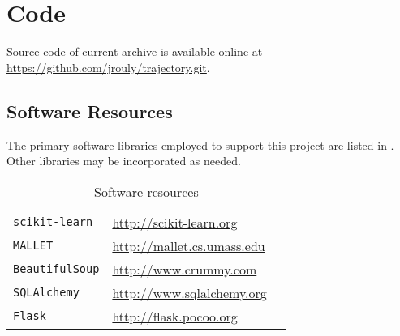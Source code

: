 

\section{Code}
\label{app:code}

Source code of current archive is available online at \url{https://github.com/jrouly/trajectory.git}.


\subsection{Software Resources}
\label{app:resources}


The primary software libraries employed to support this project are listed in . Other libraries may be incorporated as needed.

\begin{table}[ht]
\centering
\begin{tabular}{lll}
\toprule
\texttt{scikit-learn} & \url{http://scikit-learn.org} \\
\texttt{MALLET} & \url{http://mallet.cs.umass.edu} \\
\texttt{BeautifulSoup} & \url{http://www.crummy.com} \\
\texttt{SQLAlchemy} & \url{http://www.sqlalchemy.org} \\
\texttt{Flask} & \url{http://flask.pocoo.org} \\
\bottomrule
\end{tabular}
\caption{Software resources\label{table:software-resources}}
\end{table}



